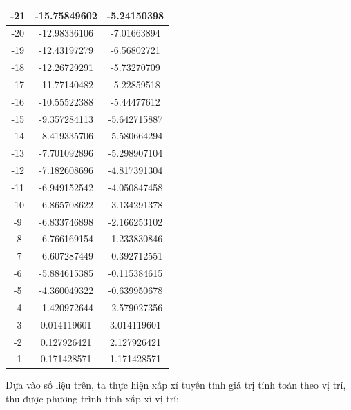 \begin{longtable}{|c|c|c|}
                -21 & -15.75849602 & -5.24150398 \\
                \hline
                -20 & -12.98336106 & -7.01663894 \\
                \hline
                -19 & -12.43197279 & -6.56802721 \\
                \hline
                -18 & -12.26729291 & -5.73270709 \\
                \hline
                -17 & -11.77140482 & -5.22859518 \\
                \hline
                -16 & -10.55522388 & -5.44477612 \\
                \hline
                -15 & -9.357284113 & -5.642715887 \\
                \hline
                -14 & -8.419335706 & -5.580664294 \\
                \hline
                -13 & -7.701092896 & -5.298907104 \\
                \hline
                -12 & -7.182608696 & -4.817391304 \\
                \hline
                -11 & -6.949152542 & -4.050847458 \\
                \hline
                -10 & -6.865708622 & -3.134291378 \\
                \hline
                -9 & -6.833746898 & -2.166253102 \\
                \hline
                -8 & -6.766169154 & -1.233830846 \\
                \hline
                -7 & -6.607287449 & -0.392712551 \\
                \hline
                -6 & -5.884615385 & -0.115384615 \\
                \hline
                -5 & -4.360049322 & -0.639950678 \\
                \hline
                -4 & -1.420972644 & -2.579027356 \\
                \hline
                -3 & 0.014119601 & 3.014119601 \\
                \hline
                -2 & 0.127926421 & 2.127926421 \\
                \hline
                -1 & 0.171428571 & 1.171428571 \\
                \hline        
            \end{longtable}
            \hspace*{0.6cm}Dựa vào số liệu trên, ta thực hiện xấp xỉ tuyến tính giá trị tính toán theo vị trí, thu được phương trình tính xấp xỉ vị trí:
